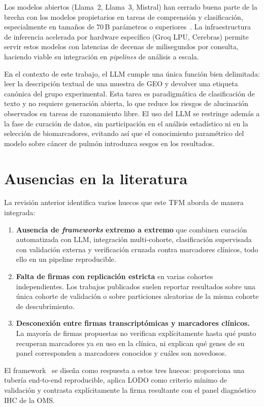Los modelos abiertos (Llama~2, Llama~3, Mistral) han cerrado buena parte
de la brecha con los modelos propietarios en tareas de comprensión y
clasificación, especialmente en tamaños de 70\,B parámetros o
superiores~\cite{touvron2023llama}. La infraestructura de inferencia
acelerada por hardware específico (Groq LPU, Cerebras) permite servir estos
modelos con latencias de decenas de milisegundos por consulta, haciendo
viable su integración en \emph{pipelines} de análisis a escala.

En el contexto de este trabajo, el LLM cumple una única función bien
delimitada: leer la descripción textual de una muestra de GEO y devolver una
etiqueta canónica del grupo experimental. Esta tarea es paradigmática de
clasificación de texto y no requiere generación abierta, lo que reduce los
riesgos de alucinación observados en tareas de razonamiento libre. El uso
del LLM se restringe además a la fase de curación de datos, sin
participación en el análisis estadístico ni en la selección de
biomarcadores, evitando así que el conocimiento paramétrico del modelo
sobre cáncer de pulmón introduzca sesgos en los resultados.

\section{Ausencias en la literatura}
\label{sec:huecos}

La revisión anterior identifica varios huecos que este TFM aborda de
manera integrada:

\begin{enumerate}
  \item \textbf{Ausencia de \emph{frameworks} extremo a extremo} que
  combinen curación automatizada con LLM, integración multi-cohorte,
  clasificación supervisada con validación externa y verificación cruzada
  contra marcadores clínicos, todo ello en un pipeline reproducible.
  \item \textbf{Falta de firmas con replicación estricta} en varias
  cohortes independientes. Los trabajos publicados suelen reportar
  resultados sobre una única cohorte de validación o sobre particiones
  aleatorias de la misma cohorte de descubrimiento.
  \item \textbf{Desconexión entre firmas transcriptómicas y marcadores
  clínicos.} La mayoría de firmas propuestas no verifican explícitamente
  hasta qué punto recuperan marcadores ya en uso en la clínica, ni
  explican qué genes de su panel corresponden a marcadores conocidos y
  cuáles son novedosos.
\end{enumerate}

El framework \framework\ se diseña como respuesta a estos tres huecos:
proporciona una tubería end-to-end reproducible, aplica LODO como criterio
mínimo de validación y contrasta explícitamente la firma resultante con el
panel diagnóstico IHC de la OMS.
